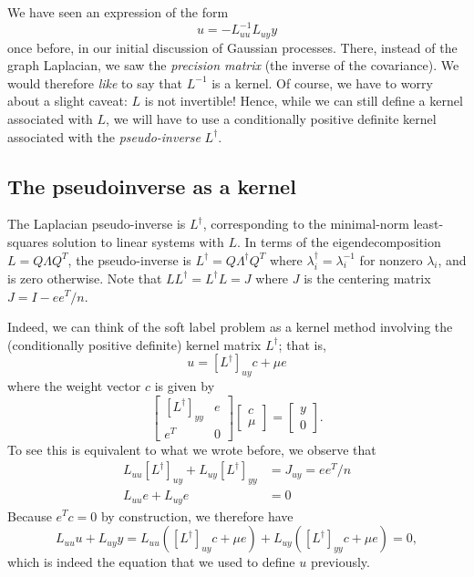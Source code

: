 \documentclass[12pt, leqno]{article} %
\begin{document}
We have seen an expression of the form
\[
  u = -L_{uu}^{-1} L_{uy} y
\]
once before, in our initial discussion of Gaussian processes.  There,
instead of the graph Laplacian, we saw the {\em precision matrix}
(the inverse of the covariance).  We would therefore {\em like} to say
that $L^{-1}$ is a kernel.  Of course, we have to worry about
a slight caveat: $L$ is not invertible!  Hence, while we can still
define a kernel associated with $L$, we will have to use a
conditionally positive definite kernel associated with the
{\em pseudo-inverse} $L^\dagger$.

\subsection{The pseudoinverse as a kernel}

The Laplacian pseudo-inverse is $L^\dagger$, corresponding to the
minimal-norm least-squares solution to linear systems with $L$.  In
terms of the eigendecomposition $L = Q \Lambda Q^T$, the
pseudo-inverse is $L^\dagger = Q \Lambda^\dagger Q^T$ where
$\lambda_i^\dagger = \lambda_i^{-1}$ for nonzero $\lambda_i$, and is
zero otherwise.  Note that $LL^\dagger = L^\dagger L = J$ where $J$ is
the centering matrix $J = I-ee^T/n$.

Indeed, we can think of the soft label
problem as a kernel method involving the (conditionally positive
definite) kernel matrix $L^\dagger$; that is,
\[
  u = [L^\dagger]_{uy} c + \mu e
\]
where the weight vector $c$ is given by
\[
  \begin{bmatrix}
    [L^\dagger]_{yy} & e \\
    e^T & 0
  \end{bmatrix}
  \begin{bmatrix} c \\ \mu \end{bmatrix} =
  \begin{bmatrix} y \\ 0 \end{bmatrix}.
\]
To see this is equivalent to what we wrote before, we observe that
\begin{align*}
  L_{uu} [L^\dagger]_{uy} + L_{uy} [L^\dagger]_{yy} &= J_{uy} = ee^T/n \\
  L_{uu} e + L_{uy} e &= 0
\end{align*}
Because $e^T c = 0$ by construction, we therefore have
\[
  L_{uu} u + L_{uy} y = 
  L_{uu} ([L^{\dagger}]_{uy} c + \mu e) +
  L_{uy} ([L^\dagger]_{yy} c + \mu e) = 0,
\]
which is indeed the equation that we used to define $u$ previously.
\end{document}
